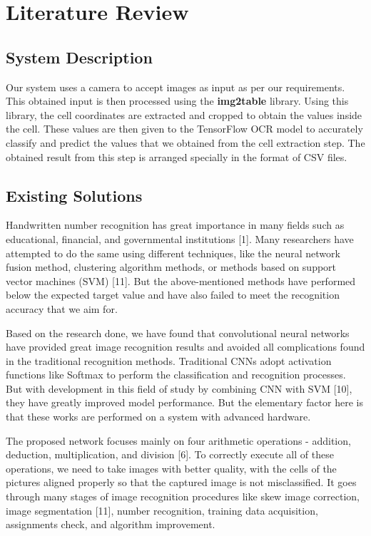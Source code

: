\chapter{Literature Review}
 
\setcounter{equation}{0}
\section{System Description}

Our system uses a camera to accept images as input as per our requirements. This obtained input is then processed using the \textbf{img2table} library. Using this library, the cell coordinates are extracted and cropped to obtain the values inside the cell. These values are then given to the TensorFlow OCR model to accurately classify and predict the values that we obtained from the cell extraction step. The obtained result from this step is arranged specially in the format of CSV files.

\section{Existing Solutions}
Handwritten number recognition has great importance in many fields such as educational, financial, and governmental institutions [1]. Many researchers have attempted to do the same using different techniques, like the neural network fusion method, clustering algorithm methods, or methods based on support vector machines (SVM) [11]. But the above-mentioned methods have performed below the expected target value and have also failed to meet the recognition accuracy that we aim for.

\noindent 
Based on the research done, we have found that convolutional neural networks have provided great image recognition results and avoided all complications found in the traditional recognition methods. Traditional CNNs adopt activation functions like Softmax to perform the classification and recognition processes. But with development in this field of study by combining CNN with SVM [10], they have greatly improved model performance. But the elementary factor here is that these works are performed on a system with advanced hardware.
\par
\setlength{\parskip}{3ex}
\noindent
The proposed network focuses mainly on four arithmetic operations - addition, deduction, multiplication, and division [6]. To correctly execute all of these operations, we need to take images with better quality, with the cells of the pictures aligned properly so that the captured image is not misclassified. It goes through many stages of image recognition procedures like skew image correction, image segmentation [11], number recognition, training data acquisition, assignments check, and algorithm improvement.

